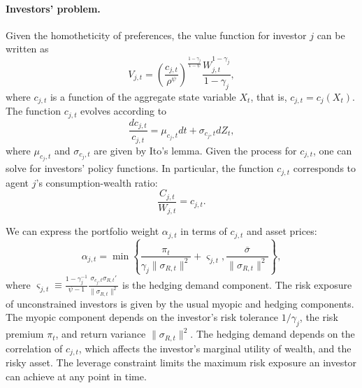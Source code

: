 \paragraph{Investors' problem.} Given the homotheticity of preferences, the value function for investor $j$ can be written as
\begin{equation}\nonumber
    V_{j,t} = \left( \frac{c_{j,t}}{\rho^\psi} \right)^{\frac{1-\gamma_j}{1-\psi}} \frac{W_{j,t}^{1-\gamma_j}}{1-\gamma_j},
\end{equation}
where $c_{j,t}$ is a function of the aggregate state variable $X_t$, that is, $c_{j,t} = c_j(X_t)$. The function $c_{j,t}$ evolves according to
\begin{equation}\nonumber
    \frac{d c_{j,t}}{c_{j,t}} = \mu_{c_j,t} dt + \sigma_{c_j,t} d Z_t,
\end{equation}
where $\mu_{c_j,t}$ and $\sigma_{c_j,t}$ are given by Ito's lemma. 
Given the process for $c_{j,t}$, one can solve for investors' policy functions. In particular, the function $c_{j,t}$ corresponds to agent $j$'s consumption-wealth ratio:
\begin{equation}\nonumber
    \frac{C_{j,t}}{W_{j,t}} = c_{j,t}.
\end{equation}

We can express the portfolio weight $\alpha_{j,t}$ in terms of $c_{j,t}$ and asset prices: 
\begin{equation}\label{eq:portfolio_share}
    \alpha_{j,t} = \min \left\{ \frac{\pi_t}{\gamma_j \|\sigma_{R,t}\|^2}  + \varsigma_{j,t}, \frac{\overline{\sigma}}{\|\sigma_{R,t}\|^2} \right\}, 
\end{equation}
where $\varsigma_{j,t} \equiv \frac{1-\gamma_j^{-1}}{\psi-1} \frac{\sigma_{c_j,t} \sigma_{R,t}'}{\|\sigma_{R,t}\|^2}$ is the hedging demand component.
The risk exposure of unconstrained investors is given by the usual myopic and hedging components. The myopic component depends on the investor's risk tolerance $1/\gamma_j$, the risk premium $\pi_t$, and return variance $\|\sigma_{R,t}\|^2$. The hedging demand depends on the correlation of $c_{j,t}$, which affects the investor's marginal utility of wealth, and the risky asset. The leverage constraint limits the maximum risk exposure an investor can achieve at any point in time. 

